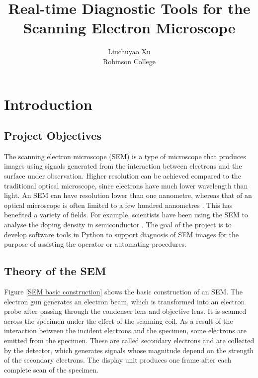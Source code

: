 \documentclass{article}
\title{Real-time Diagnostic Tools for the Scanning Electron Microscope}
\author{Liuchuyao Xu\\Robinson College}
\begin{document}
\maketitle
\tableofcontents
\newpage

\section{Introduction}
\subsection{Project Objectives}
The scanning electron microscope (SEM) is a type of microscope that produces images using signals generated from the interaction between electrons and the surface under observation. Higher resolution can be achieved compared to the traditional optical microscope, since electrons have much lower wavelength than light. An SEM can have resolution lower than one nanometre, whereas that of an optical microscope is often limited to a few hundred nanometres \cite{SEM wiki}. This has benefited a variety of fields. For example, scientists have been using the SEM to analyse the doping density in semiconductor \cite{SEM for semiconductor}. The goal of the project is to develop software tools in Python to support diagnosis of SEM images for the purpose of assisting the operator or automating procedures.

\subsection{Theory of the SEM}
Figure \ref{SEM basic construction} shows the basic construction of an SEM. The electron gun generates an electron beam, which is transformed into an electron probe after passing through the condenser lens and objective lens. It is scanned across the specimen under the effect of the scanning coil. As a result of the interaction between the incident electrons and the specimen, some electrons are emitted from the specimen. These are called secondary electrons and are collected by the detector, which generates signals whose magnitude depend on the strength of the secondary electrons. The display unit produces one frame after each complete scan of the specimen.
\end{document}
